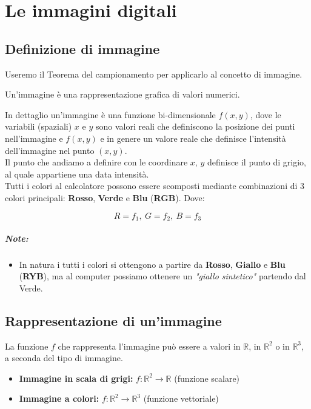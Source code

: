 \chapter{Le immagini digitali}
\section{Definizione di immagine}
Useremo il Teorema del campionamento per applicarlo al concetto di immagine.
\begin{definition}
    Un’immagine è una rappresentazione grafica di valori numerici.
\end{definition}
In dettaglio un’immagine è una funzione bi-dimensionale $f(x,y)$, dove le
variabili (spaziali) $x$ e $y$ sono valori reali che definiscono la posizione
dei punti nell’immagine e $f(x,y)$ e in genere un valore reale che definisce
l’intensità dell’immagine nel punto $(x,y)$. \\Il punto che andiamo a definire
con le coordinare $x$, $y$ definisce il punto di grigio, al quale appartiene una
data intensità.\\

Tutti i colori al calcolatore possono essere scomposti
mediante combinazioni di 3 colori principali: \textbf{Rosso}, \textbf{Verde} e
\textbf{Blu} (\textbf{RGB}). Dove:

$$
    R = f_1, \ G = f_2, \ B = f_3
$$

\paragraph{Note:}
\begin{itemize}
    \item In natura i tutti i colori si ottengono a partire da \textbf{Rosso},
          \textbf{Giallo} e \textbf{Blu} (\textbf{RYB}), ma al computer possiamo ottenere
          un \textit{"giallo sintetico"} partendo dal Verde.
\end{itemize}

\section{Rappresentazione di un’immagine}
La funzione $f$ che rappresenta l’immagine può essere a valori in $\mathbb{R}$,
in $\mathbb{R}^2$ o in $\mathbb{R}^3$, a seconda del tipo di immagine.

\begin{itemize}
    \item \textbf{Immagine in scala di grigi:} $f:\mathbb{R}^2 \rightarrow \mathbb{R}$ (funzione
          scalare)
    \item \textbf{Immagine a colori:} $f:\mathbb{R}^2 \rightarrow \mathbb{R}^3$ (funzione
          vettoriale)
\end{itemize}

